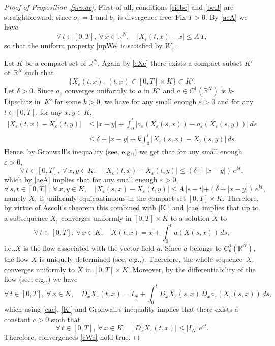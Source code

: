 \documentclass[11pt]{article}
\newcommand{\ie}{i.e.,\xspace}
\newcommand{\eg}{e.g.,\xspace}
\let \de \delta
\def \RR {\mathbb R}
\theoremstyle{plain}
\theoremstyle{definition}
\numberwithin{equation}{section}
\begin{document}
\begin{proof}[Proof of Proposition~\ref{pro.ae}]
First of all, conditions \eqref{siebe} and \eqref{beB} are straightforward, since $\sigma_\varepsilon=1$ and $b_\varepsilon$ is divergence free.
Fix $T>0$. By \eqref{aeA} we have
\begin{equation}\label{eXe}
\forall\,t\in[0,T],\ \forall\,x\in\RR^N,\quad |X_\varepsilon(t,x)-x|\leq A\,T,
\end{equation}
so that the uniform property \eqref{upWe} is satisfied by $W_\varepsilon$.

Let $K$ be a compact set of $\RR^N$. Again by \eqref{eXe} there exists a compact subset $K'$ of~$\RR^N$ such that
\begin{equation}\label{K'}
\big\{X_\varepsilon(t,x),\,(t,x)\in[0,T]\times K\big\}\subset K'.
\end{equation}
Let $\de>0$. Since $a_\varepsilon$ converges uniformly to $a$ in $K'$ and $a\in C^1(\RR^N)$ is $k$-Lipschitz in~$K'$ for some $k>0$, we have for any small enough $\varepsilon>0$ and for any $t\in[0,T]$, for any $x,y\in K$,
\begin{align*}
\big|X_\varepsilon(t,x)-X_\varepsilon(t,y)\big| & \leq |x-y|+\int_0^t \big|a_\varepsilon(X_\varepsilon(s,x))-a_\varepsilon(X_\varepsilon(s,y))\big|\,ds
\\
& \leq \de+|x-y|+k\int_0^t\big|X_\varepsilon(s,x)-X_\varepsilon(s,y)\big|\,ds.
\end{align*}
Hence, by Gronwall's inequality (see, \eg \cite[\S 17.3]{HSD}) we get that for any small enough $\varepsilon>0$,
\[
\forall\,t\in[0,T],\ \forall\,x,y\in K,\quad |X_\varepsilon(t,x)-X_\varepsilon(t,y)\big|\leq(\de+|x-y|)\,e^{kt},
\]
which by \eqref{aeA} implies that for any small enough $\varepsilon>0$,
\[
\forall\,s,t\in[0,T],\ \forall\,x,y\in K,\quad |X_\varepsilon(s,x)-X_\varepsilon(t,y)\big|\leq A\,|s-t|+(\de+|x-y|)\,e^{kt},
\]
namely $X_\varepsilon$ is uniformly equicontinuous in the compact set $[0,T]\times K$. Therefore, by virtue of Ascoli's theorem this combined with \eqref{K'} and \eqref{cae} implies that up to a subsequence $X_\varepsilon$ converges uniformly in $[0,T]\times K$ to a solution $X$ to
\[
\forall\,t\in[0,T],\ \forall\,x\in K,\quad X(t,x)=x+\int_0^t a(X(s,x))\,ds,
\]
\ie $X$ is the flow associated with the vector field $a$. Since $a$ belongs to $C^1_b(\RR^N)$, the flow $X$ is uniquely determined (see, \eg \cite[\S 17.4]{HSD}).
Therefore, the whole sequence~$X_\varepsilon$ converges uniformly to $X$ in $[0,T]\times K$.
Moreover, by the differentiability of the flow (see, \eg \cite[\S 17.6]{HSD}) we have
\begin{equation}\label{DX}
\forall\,t\in[0,T],\ \forall\,x\in K,\quad D_xX_\varepsilon(t,x)=I_N+\int_0^t D_x X_\varepsilon(s,x)\,D_x a_\varepsilon(X_\varepsilon(s,x))\,ds,
\end{equation}
which using \eqref{cae}, \eqref{K'} and Gronwall's inequality implies that there exists a constant $c>0$ such that
\[
\forall\,t\in[0,T],\ \forall\,x\in K,\quad |D_x X_\varepsilon(t,x)|\leq |I_N|\,e^{ct}.
\]
Therefore, convergences \eqref{cWe} hold true.


\end{proof}
\end{document}
